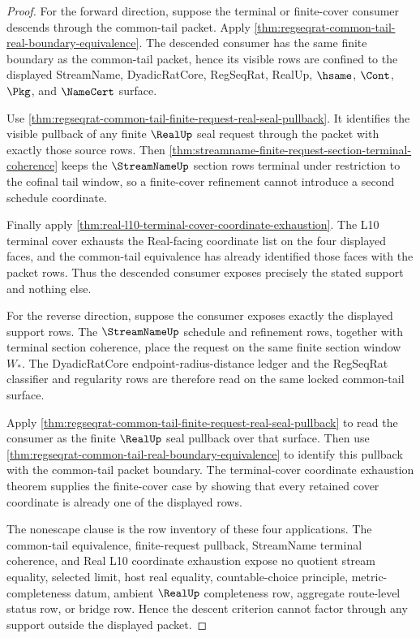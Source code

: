 \begin{proof}
For the forward direction, suppose the terminal or finite-cover consumer descends through the common-tail packet. Apply \autoref{thm:regseqrat-common-tail-real-boundary-equivalence}. The descended consumer has the same finite boundary as the common-tail packet, hence its visible rows are confined to the displayed StreamName, DyadicRatCore, RegSeqRat, RealUp, $\hsame$, $\Cont$, $\Pkg$, and $\NameCert$ surface.

Use \autoref{thm:regseqrat-common-tail-finite-request-real-seal-pullback}. It identifies the visible pullback of any finite $\RealUp$ seal request through the packet with exactly those source rows. Then \autoref{thm:streamname-finite-request-section-terminal-coherence} keeps the $\StreamNameUp$ section rows terminal under restriction to the cofinal tail window, so a finite-cover refinement cannot introduce a second schedule coordinate.

Finally apply \autoref{thm:real-l10-terminal-cover-coordinate-exhaustion}. The L10 terminal cover exhausts the Real-facing coordinate list on the four displayed faces, and the common-tail equivalence has already identified those faces with the packet rows. Thus the descended consumer exposes precisely the stated support and nothing else.

For the reverse direction, suppose the consumer exposes exactly the displayed support rows. The $\StreamNameUp$ schedule and refinement rows, together with terminal section coherence, place the request on the same finite section window $W_\ast$. The DyadicRatCore endpoint-radius-distance ledger and the RegSeqRat classifier and regularity rows are therefore read on the same locked common-tail surface.

Apply \autoref{thm:regseqrat-common-tail-finite-request-real-seal-pullback} to read the consumer as the finite $\RealUp$ seal pullback over that surface. Then use \autoref{thm:regseqrat-common-tail-real-boundary-equivalence} to identify this pullback with the common-tail packet boundary. The terminal-cover coordinate exhaustion theorem supplies the finite-cover case by showing that every retained cover coordinate is already one of the displayed rows.

The nonescape clause is the row inventory of these four applications. The common-tail equivalence, finite-request pullback, StreamName terminal coherence, and Real L10 coordinate exhaustion expose no quotient stream equality, selected limit, host real equality, countable-choice principle, metric-completeness datum, ambient $\RealUp$ completeness row, aggregate route-level status row, or bridge row. Hence the descent criterion cannot factor through any support outside the displayed packet.
\end{proof}

